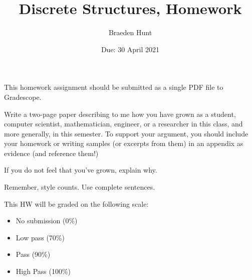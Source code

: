 \documentclass{article}
\title{Discrete Structures, Homework \hwnum}
\author{Braeden Hunt}
\date{Due: 30 April 2021}
\begin{document}
\maketitle

This homework assignment should be
submitted as a single PDF file to Gradescope.

Write a two-page paper describing to me how you have grown as a student,
computer scientist, mathematician, engineer, or a researcher in this class, and
more generally, in this semester.  To support your argument, you should include
your homework or writing samples (or excerpts from them) in an appendix as
evidence (and reference them!)

If you do not feel that you've grown, explain why.

Remember, style counts. Use complete sentences.

This HW will be graded on the following scale:
\begin{itemize}
    \item No submission (0\%)
    \item Low pass (70\%)
    \item Pass (90\%)
    \item High Pass (100\%)
\end{itemize}
\end{document}

